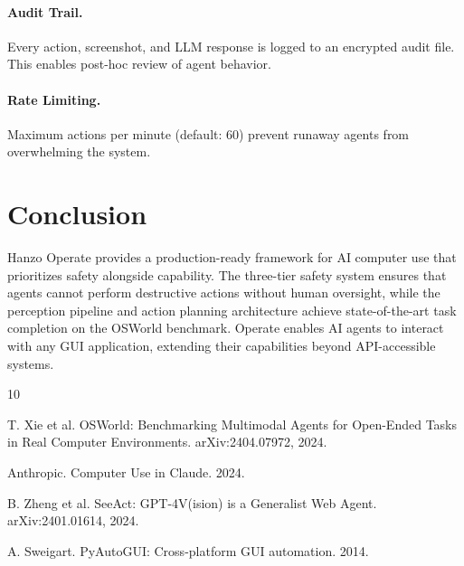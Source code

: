 \documentclass[11pt,twocolumn]{article}
\begin{document}
\paragraph{Audit Trail.} Every action, screenshot, and LLM response is logged to an encrypted audit file. This enables post-hoc review of agent behavior.

\paragraph{Rate Limiting.} Maximum actions per minute (default: 60) prevent runaway agents from overwhelming the system.

\section{Conclusion}

Hanzo Operate provides a production-ready framework for AI computer use that prioritizes safety alongside capability. The three-tier safety system ensures that agents cannot perform destructive actions without human oversight, while the perception pipeline and action planning architecture achieve state-of-the-art task completion on the OSWorld benchmark. Operate enables AI agents to interact with any GUI application, extending their capabilities beyond API-accessible systems.


\begin{thebibliography}{10}

T. Xie et al. OSWorld: Benchmarking Multimodal Agents for Open-Ended Tasks in Real Computer Environments. arXiv:2404.07972, 2024.

Anthropic. Computer Use in Claude. 2024.

B. Zheng et al. SeeAct: GPT-4V(ision) is a Generalist Web Agent. arXiv:2401.01614, 2024.

A. Sweigart. PyAutoGUI: Cross-platform GUI automation. 2014.

\end{thebibliography}
\end{document}
